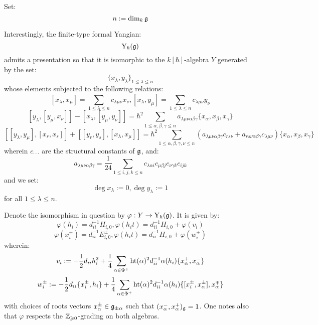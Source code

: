         \begin{definition}[Quantisations] \label{def: quantisations}
            
        \end{definition}
        \begin{example} \label{example: finite_type_QUEs}
            
        \end{example}
        \begin{example} \label{example: finite_type_yangians}
            Set:
                $$n := \dim_k \mathfrak{g}$$
        
            Interestingly, the finite-type formal Yangian:
                $$\mathrm{Y}_{\hbar}(\mathfrak{g})$$
            admits a presentation so that it is isomorphic to the $k[\hbar]$-algebra $Y$ generated by the set:
                $$\{ x_{\lambda}, y_{\lambda} \}_{1 \leq \lambda \leq n}$$
            whose elements subjected to the following relations:
                $$[ x_{\lambda}, x_{\mu} ] = \sum_{1 \leq \lambda \leq n} c_{\lambda \mu \nu} x_{\nu}, [ x_{\lambda}, y_{\mu} ] = \sum_{1 \leq \lambda \leq n} c_{\lambda \mu \nu} y_{\nu}$$
                $$[ y_{\lambda}, [y_{\mu}, x_{\nu}] ] - [ x_{\lambda}, [y_{\mu}, y_{\nu}] ] = \hbar^2 \sum_{1 \leq \alpha, \beta, \gamma \leq n} a_{\lambda \mu \nu \alpha \beta \gamma} \{ x_{\alpha}, x_{\beta}, x_{\gamma} \}$$
                $$[ [y_{\lambda}, y_{\mu}], [x_r, x_s] ] + [ [y_r, y_s], [x_{\lambda}, x_{\mu}] ] = \hbar^2 \sum_{1 \leq \alpha, \beta, \gamma, \nu \leq n} ( a_{\lambda \mu \nu \alpha \beta \gamma} c_{r s \nu} + a_{r s \nu \alpha \beta \gamma} c_{\lambda \mu \nu} ) \{ x_{\alpha}, x_{\beta}, x_{\gamma} \}$$
            wherein $c_{\cdot \cdot \cdot}$ are the structural constants of $\mathfrak{g}$, and:
                $$a_{\lambda \mu \nu \alpha \beta \gamma} = \frac{1}{24} \sum_{1 \leq i, j, k \leq n} c_{\lambda \alpha i} c_{\mu \beta j} c_{\nu \gamma k} c_{i j k}$$
            and we set:
                $$\deg x_{\lambda} := 0, \deg y_{\lambda} := 1$$
            for all $1 \leq \lambda \leq n$.
            
            Denote the isomorphism in question by $\varphi: Y \to \mathrm{Y}_{\hbar}(\mathfrak{g})$. It is given by:
                $$\varphi(h_i) = d_{ii}^{-1} H_{i, 0}, \varphi(h_i t) = d_{ii}^{-1} H_{i, 0} + \varphi(v_i)$$
                $$\varphi(x_i^{\pm}) = d_{ii}^{-1} E_{i, 0}^{\pm}, \varphi(h_i t) = d_{ii}^{-1} H_{i, 0} + \varphi(w_i^{\pm})$$
            wherein:
                $$v_i := -\frac12 d_{ii} h_i^2 + \frac14 \sum_{\alpha \in \Phi^+} \operatorname{ht}(\alpha)^2 d_{ii}^{-1} \alpha(h_i) \{x_{\alpha}^+, x_{\alpha}^-\}$$
                $$w_i^{\pm} := -\frac12 d_{ii} \{x_i^{\pm}, h_i\} + \frac14 \sum_{\alpha \in \Phi^+} \operatorname{ht}(\alpha)^2 d_{ii}^{-1} \alpha(h_i) \{[x_i^{\pm}, x_{\alpha}^{\pm}], x_{\alpha}^{\mp}\}$$
            with choices of roots vectors $x_{\alpha}^{\pm} \in \mathfrak{g}_{\pm \alpha}$ such that $(x_{\alpha}^-, x_{\alpha}^+)_{\mathfrak{g}} = 1$. One notes also that $\varphi$ respects the $\mathbb{Z}_{\geqslant 0}$-grading on both algebras.
        

\end{example}
